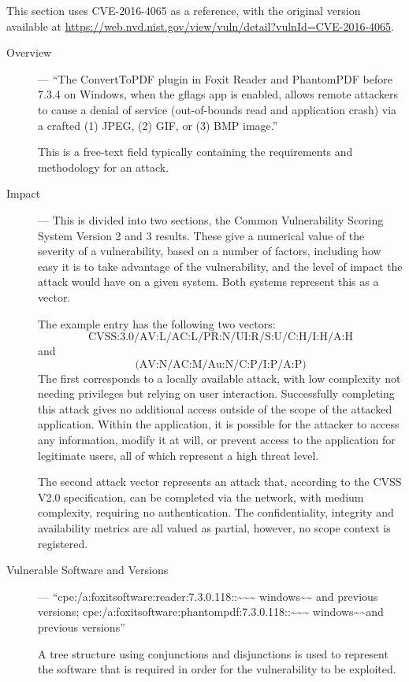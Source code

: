 This section uses CVE-2016-4065 as a reference, with the original version 
available at \url{https://web.nvd.nist.gov/view/vuln/detail?vulnId=CVE-2016-4065}.

\begin{description}
\item[Overview] --- ``The ConvertToPDF plugin in Foxit Reader and PhantomPDF
	before 7.3.4 on Windows, when the gflags app is enabled, allows remote
	attackers to cause a denial of service (out-of-bounds read and
	application crash) via a crafted (1) JPEG, (2) GIF, or (3) BMP image.''

	This is a free-text field typically containing the requirements and
	methodology for an attack.

\item[Impact] --- This is divided into two sections, the Common Vulnerability
	Scoring System Version 2 and 3 results. These give a numerical value of
	the severity of a vulnerability, based on a number of factors,
	including how easy it is to take advantage of the vulnerability, and
	the level of impact the attack would have on a given system.  Both
	systems represent this as a vector.

    The example entry has the following two vectors:
    \[\text{CVSS:3.0/AV:L/AC:L/PR:N/UI:R/S:U/C:H/I:H/A:H}\] and
    \[\text{(AV:N/AC:M/Au:N/C:P/I:P/A:P)}\]  The first corresponds to a locally
    available attack, with low complexity not needing privileges but relying on
    user interaction.  Successfully completing this attack gives no additional
    access outside of the scope of the attacked application.  Within the
    application, it is possible for the attacker to access any information,
    modify it at will, or prevent access to the application for legitimate
    users, all of which represent a high threat level.

    The second attack vector represents an attack that, according to the CVSS
    V2.0 specification, can be completed via the network, with medium
    complexity, requiring no authentication.  The confidentiality, integrity
    and availability metrics are all valued as partial, however, no scope
    context is registered.

\item[Vulnerable Software and Versions] ---
	``cpe:/a:foxitsoftware:reader:7.3.0.118::\textasciitilde\textasciitilde\textasciitilde
	windows\textasciitilde\textasciitilde{} and previous versions;
	cpe:/a:foxitsoftware:phantompdf:7.3.0.118::\textasciitilde\textasciitilde\textasciitilde
	windows\textasciitilde\textasciitilde and previous versions'' 

    A tree structure using conjunctions and disjunctions is used to represent
    the software that is required in order for the vulnerability to be
    exploited.

\end{description}

